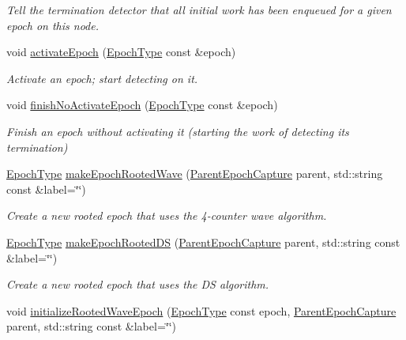 \begin{DoxyCompactItemize}
\begin{DoxyCompactList}\small\item\em Tell the termination detector that all initial work has been enqueued for a given epoch on this node. \end{DoxyCompactList}\item 
void \hyperlink{structvt_1_1term_1_1_termination_detector_af9f932ff57f12da573a75adbbaee73df}{activate\+Epoch} (\hyperlink{namespacevt_a81d11b28122d43bf9834577e4a06440f}{Epoch\+Type} const \&epoch)
\begin{DoxyCompactList}\small\item\em Activate an epoch; start detecting on it. \end{DoxyCompactList}\item 
void \hyperlink{structvt_1_1term_1_1_termination_detector_a349739e9ee6dea98a863b4afb1e49c10}{finish\+No\+Activate\+Epoch} (\hyperlink{namespacevt_a81d11b28122d43bf9834577e4a06440f}{Epoch\+Type} const \&epoch)
\begin{DoxyCompactList}\small\item\em Finish an epoch without activating it (starting the work of detecting its termination) \end{DoxyCompactList}\item 
\hyperlink{namespacevt_a81d11b28122d43bf9834577e4a06440f}{Epoch\+Type} \hyperlink{structvt_1_1term_1_1_termination_detector_af4e6b3ce62dd3b1f0f0f9f5829e94720}{make\+Epoch\+Rooted\+Wave} (\hyperlink{structvt_1_1term_1_1_parent_epoch_capture}{Parent\+Epoch\+Capture} parent, std\+::string const \&label=\char`\"{}\char`\"{})
\begin{DoxyCompactList}\small\item\em Create a new rooted epoch that uses the 4-\/counter wave algorithm. \end{DoxyCompactList}\item 
\hyperlink{namespacevt_a81d11b28122d43bf9834577e4a06440f}{Epoch\+Type} \hyperlink{structvt_1_1term_1_1_termination_detector_ab415e4ad8be8c61f05005fbf60167fdf}{make\+Epoch\+Rooted\+DS} (\hyperlink{structvt_1_1term_1_1_parent_epoch_capture}{Parent\+Epoch\+Capture} parent, std\+::string const \&label=\char`\"{}\char`\"{})
\begin{DoxyCompactList}\small\item\em Create a new rooted epoch that uses the DS algorithm. \end{DoxyCompactList}\item 
void \hyperlink{structvt_1_1term_1_1_termination_detector_a46df4c42ff71d25c5a19cf6a21b9263f}{initialize\+Rooted\+Wave\+Epoch} (\hyperlink{namespacevt_a81d11b28122d43bf9834577e4a06440f}{Epoch\+Type} const epoch, \hyperlink{structvt_1_1term_1_1_parent_epoch_capture}{Parent\+Epoch\+Capture} parent, std\+::string const \&label=\char`\"{}\char`\"{})

\end{DoxyCompactItemize}
